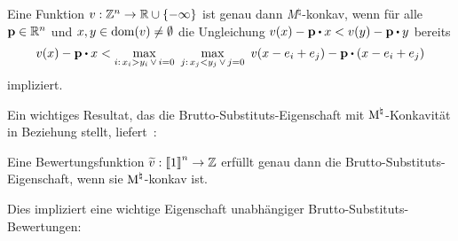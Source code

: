 \begin{theorem}\label{thm-char-m-concave}
	Eine Funktion $v:\mathbb{Z}^n \rightarrow \mathbb{R} \cup \{ -\infty \}$ ist genau dann \emph{M}$^\natural$-konkav, wenn für alle $\mathbf{p}\in\mathbb{R}^n$ und $x,y\in\operatorname{dom}(v)\neq\emptyset$ die Ungleichung $v(x) - \fp\bcdot x < v(y) - \fp \bcdot y$ bereits \[ 
		v(x) - \fp\bcdot x < 
			\max_{i:\, x_i > y_i \,  \vee \, i = 0} \,\,
				\max_{j:\, x_j < y_j \, \vee \, j=0} \,\,
					v(x - e_i + e_j) - \fp \bcdot (x - e_i + e_j)
	\]
	impliziert.
\end{theorem}

Ein wichtiges Resultat, das die Brutto-Substituts-Eigenschaft mit $\textrm{\textup{M}}^\natural$-Konkavität in Beziehung stellt, liefert~\cite[Theorem 2.1]{Fujishige2003}:

\begin{theorem}\label{thm-fujishige-gs-iff-concave}
	Eine Bewertungsfunktion $\widetilde{v}:\left\llbracket 1 \right\rrbracket^n\rightarrow \mathbb{Z}$ erfüllt genau dann die Brutto-Substituts-Eigenschaft, wenn sie $\textrm{\textup{M}}^\natural$-konkav ist.
\end{theorem}

Dies impliziert eine wichtige Eigenschaft unabhängiger Brutto-Substituts-Bewertungen:

